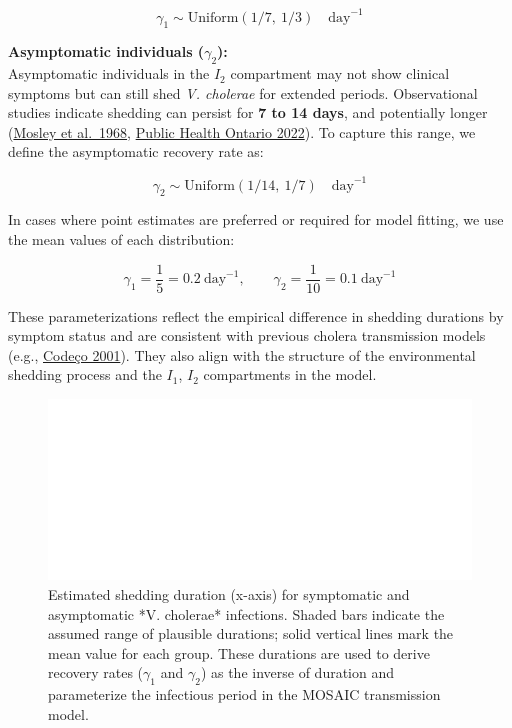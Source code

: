 \documentclass[
]{book}
\begin{document}
\[
\gamma_1 \sim \text{Uniform}(1/7,\ 1/3) \quad \text{day}^{-1}
\]

\textbf{Asymptomatic individuals (\(\gamma_2\)):}\\
Asymptomatic individuals in the \(I_2\) compartment may not show clinical symptoms but can still shed \emph{V. cholerae} for extended periods. Observational studies indicate shedding can persist for \textbf{7 to 14 days}, and potentially longer (\href{https://www.ncbi.nlm.nih.gov/pmc/articles/PMC2554681/}{Mosley et al.~1968}, \href{https://files.ontario.ca/moh-ophs-cholera-en-2022.pdf}{Public Health Ontario 2022}). To capture this range, we define the asymptomatic recovery rate as:

\[
\gamma_2 \sim \text{Uniform}(1/14,\ 1/7) \quad \text{day}^{-1}
\]

In cases where point estimates are preferred or required for model fitting, we use the mean values of each distribution:

\[
\gamma_1 = \frac{1}{5} = 0.2 \ \text{day}^{-1}, \qquad
\gamma_2 = \frac{1}{10} = 0.1 \ \text{day}^{-1}
\]

These parameterizations reflect the empirical difference in shedding durations by symptom status and are consistent with previous cholera transmission models\\
(e.g., \href{https://doi.org/10.1186/1471-2334-1-1}{Codeço 2001}). They also align with the structure of the environmental shedding process and the \(I_1\), \(I_2\) compartments in the model.

\begin{figure}

{\centering \includegraphics[width=1\linewidth]{figures/recovery_rates} 

}

\caption{Estimated shedding duration (x-axis) for symptomatic and asymptomatic *V. cholerae* infections. Shaded bars indicate the assumed range of plausible durations; solid vertical lines mark the mean value for each group. These durations are used to derive recovery rates ($\gamma_1$ and $\gamma_2$) as the inverse of duration and parameterize the infectious period in the MOSAIC transmission model.}\label{fig:recovery-rates}
\end{figure}
\end{document}
